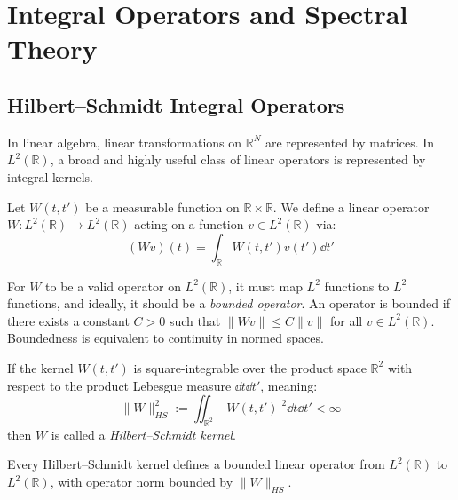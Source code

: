 \section{Integral Operators and Spectral Theory}

\subsection{Hilbert--Schmidt Integral Operators}

In linear algebra, linear transformations on $\mathbb{R}^N$ are represented by matrices. In $L^2(\mathbb{R})$, a broad and highly useful class of linear operators is represented by integral kernels.

\begin{definition}
Let $W(t, t')$ be a measurable function on $\mathbb{R} \times \mathbb{R}$. We define a linear operator $W: L^2(\mathbb{R}) \to L^2(\mathbb{R})$ acting on a function $v \in L^2(\mathbb{R})$ via:
\begin{equation}
(Wv)(t) = \int_\mathbb{R} W(t, t') v(t') \dd t'
\end{equation}

\end{definition}

For $W$ to be a valid operator on $L^2(\mathbb{R})$, it must map $L^2$ functions to $L^2$ functions, and ideally, it should be a \textit{bounded operator}. An operator is bounded if there exists a constant $C > 0$ such that $\|Wv\| \leq C\|v\|$ for all $v \in L^2(\mathbb{R})$. Boundedness is equivalent to continuity in normed spaces.

\begin{definition}
If the kernel $W(t, t')$ is square-integrable over the product space $\mathbb{R}^2$ with respect to the product Lebesgue measure $\dd t \dd t'$, meaning: \[
\|W\|_{HS}^2 := \iint_{\mathbb{R}^2} |W(t, t')|^2 \dd t \dd t' < \infty
\] then $W$ is called a \textit{Hilbert--Schmidt kernel}.
\end{definition}

\begin{theorem}
Every Hilbert--Schmidt kernel defines a bounded linear operator from $L^2(\mathbb{R})$ to $L^2(\mathbb{R})$, with operator norm bounded by $\|W\|_{HS}$.
\end{theorem}

